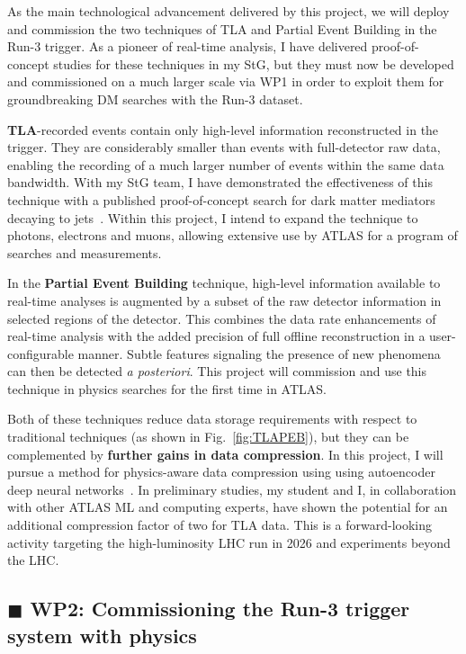 \documentclass[11pt,a4paper]{article}
\begin{document}
As the main technological advancement delivered by this project, we will deploy and commission the two techniques of TLA and Partial Event Building in the Run-3 trigger. 
As a pioneer of real-time analysis, I have delivered proof-of-concept studies for these techniques in my StG, but they must now be developed and commissioned on a much larger scale via WP1 in order to exploit them for groundbreaking DM searches with the Run-3 dataset.

\textbf{TLA}-recorded events contain only high-level information reconstructed in the trigger. They are considerably smaller than events with full-detector raw data, enabling the recording of a much larger number of events within the same data bandwidth.
With my StG team, I have demonstrated the effectiveness of this technique with a published proof-of-concept search for dark matter mediators decaying to jets~\cite{Aaboud:2018fzt}. 
Within this project, I intend to expand the technique to photons, electrons and muons, allowing extensive use by ATLAS for a program of searches and measurements. 

In the \textbf{Partial Event Building} technique, high-level information available to real-time analyses is augmented by a subset of the raw detector information in selected regions of the detector. This combines the data rate enhancements of real-time analysis with the added precision of full offline reconstruction in a user-configurable manner. 
Subtle features signaling the presence of new phenomena can then be detected \textit{a posteriori}. 
This project will commission and use this technique in physics searches for the first time in ATLAS. 

Both of these techniques reduce data storage requirements with respect to traditional techniques (as shown in Fig.~\ref{fig:TLAPEB}), but they can be complemented by \textbf{further gains in data compression}. 
In this project, I will pursue a method for physics-aware data compression using using autoencoder deep neural networks~\cite{Vincent:2008:ECR:1390156.1390294,hinton}. %
In preliminary studies, my student and I, in collaboration with other ATLAS ML and computing experts, 
have shown the potential for an additional compression factor of two for TLA data.%
This is a forward-looking activity targeting the high-luminosity LHC run in 2026 and experiments beyond the LHC.

\subsection*{\color{green} $\blacksquare$ \color{black} WP2: Commissioning the Run-3 trigger system with physics}
\end{document}
